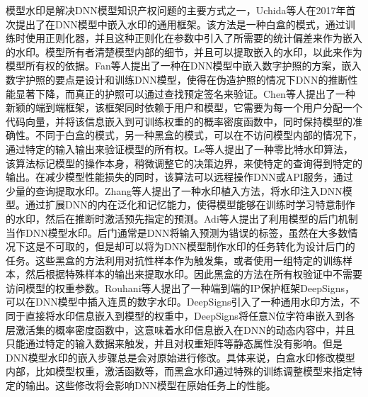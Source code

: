 模型水印是解决DNN模型知识产权问题的主要方式之一，Uchida等人\cite{uchida2017embedding}在2017年首次提出了在DNN模型中嵌入水印的通用框架。该方法是一种白盒的模式，通过训练时使用正则化器，并且这种正则化在参数中引入了所需要的统计偏差来作为嵌入的水印。模型所有者清楚模型内部的细节，并且可以提取嵌入的水印，以此来作为模型所有权的依据\cite{nagai2018digital}。Fan等人\cite{fan2019rethinking}提出了一种在DNN模型中嵌入数字护照的方案，嵌入数字护照的要点是设计和训练DNN模型，使得在伪造护照的情况下DNN的推断性能显著下降，而真正的护照可以通过查找预定签名来验证。Chen等人\cite{chen2018deepmarks}提出了一种新颖的端到端框架，该框架同时依赖于用户和模型，它需要为每一个用户分配一个代码向量，并将该信息嵌入到可训练权重的的概率密度函数中，同时保持模型的准确性。不同于白盒的模式，另一种黑盒的模式，可以在不访问模型内部的情况下，通过特定的输入输出来验证模型的所有权。Le等人\cite{le2020adversarial}提出了一种零比特水印算法，该算法标记模型的操作本身，稍微调整它的决策边界，来使特定的查询得到特定的输出。在减少模型性能损失的同时，该算法可以远程操作DNN或API服务，通过少量的查询提取水印。Zhang等人\cite{zhang2018protecting}提出了一种水印植入方法，将水印注入DNN模型。通过扩展DNN的内在泛化和记忆能力，使得模型能够在训练时学习特意制作的水印，然后在推断时激活预先指定的预测。Adi等人\cite{adi2018turning}提出了利用模型的后门机制当作DNN模型水印。后门通常是DNN将输入预测为错误的标签，虽然在大多数情况下这是不可取的，但是却可以将为DNN模型制作水印的任务转化为设计后门的任务。这些黑盒的方法利用对抗性样本作为触发集，或者使用一组特定的训练样本，然后根据特殊样本的输出来提取水印。因此黑盒的方法在所有权验证中不需要访问模型的权重参数。Rouhani等人\cite{rouhani2018deepsigns}提出了一种端到端的IP保护框架DeepSigns，可以在DNN模型中插入连贯的数字水印。DeepSigns引入了一种通用水印方法，不同于直接将水印信息嵌入到模型的权重中，DeepSigns将任意N位字符串嵌入到各层激活集的概率密度函数中，这意味着水印信息嵌入在DNN的动态内容中，并且只能通过特定的输入数据来触发，并且对权重矩阵等静态属性没有影响。但是DNN模型水印的嵌入步骤总是会对原始进行修改。具体来说，白盒水印修改模型内部，比如模型权重，激活函数等，而黑盒水印通过特殊的训练调整模型来指定特定的输出。这些修改将会影响DNN模型在原始任务上的性能。


